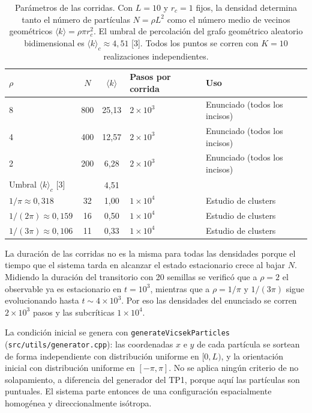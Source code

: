 \documentclass[11pt]{article}
\begin{document}
\begin{table}[htbp]
  \centering
  \caption{Parámetros de las corridas. Con $L=10$ y $r_c=1$ fijos, la densidad
    determina tanto el número de partículas $N = \rho L^2$ como el número medio
    de vecinos geométricos $\langle k \rangle = \rho \pi r_c^2$. El umbral de
    percolación del grafo geométrico aleatorio bidimensional es
    $\langle k \rangle_c \approx 4{,}51$ [3]. Todos los puntos se corren con
    $K = 10$ realizaciones independientes.}
  \label{tab:parametros}
  \begin{tabular}{lccll}
    \toprule
    $\rho$ & $N$ & $\langle k \rangle$ & Pasos por corrida & Uso \\
    \midrule
    8                          & 800 & 25{,}13 & $2\times10^{3}$ & Enunciado (todos los incisos) \\
    4                          & 400 & 12{,}57 & $2\times10^{3}$ & Enunciado (todos los incisos) \\
    2                          & 200 & \phantom{0}6{,}28 & $2\times10^{3}$ & Enunciado (todos los incisos) \\
    \midrule
    \multicolumn{2}{l}{Umbral $\langle k \rangle_c$ [3]} & \phantom{0}4{,}51 & & \\
    \midrule
    $1/\pi \approx 0{,}318$    & \phantom{0}32 & \phantom{0}1{,}00 & $1\times10^{4}$ & Estudio de clusters \\
    $1/(2\pi) \approx 0{,}159$ & \phantom{0}16 & \phantom{0}0{,}50 & $1\times10^{4}$ & Estudio de clusters \\
    $1/(3\pi) \approx 0{,}106$ & \phantom{0}11 & \phantom{0}0{,}33 & $1\times10^{4}$ & Estudio de clusters \\
    \bottomrule
  \end{tabular}
\end{table}

La duración de las corridas no es la misma para todas las densidades porque el
tiempo que el sistema tarda en alcanzar el estado estacionario crece al bajar
$N$. Midiendo la duración del transitorio con 20 semillas se verificó que a
$\rho = 2$ el observable ya es estacionario en $t = 10^3$, mientras que a
$\rho = 1/\pi$ y $1/(3\pi)$ sigue evolucionando hasta $t \sim 4\times10^3$. Por
eso las densidades del enunciado se corren $2\times10^3$ pasos y las
subcríticas $1\times10^4$.

La condición inicial se genera con \texttt{generateVicsekParticles}
(\texttt{src/utils/generator.cpp}): las coordenadas $x$ e $y$ de cada partícula
se sortean de forma independiente con distribución uniforme en $[0, L)$, y la
orientación inicial con distribución uniforme en $[-\pi, \pi]$. No se aplica
ningún criterio de no solapamiento, a diferencia del generador del TP1, porque
aquí las partículas son puntuales. El sistema parte entonces de una
configuración espacialmente homogénea y direccionalmente isótropa.
\end{document}
